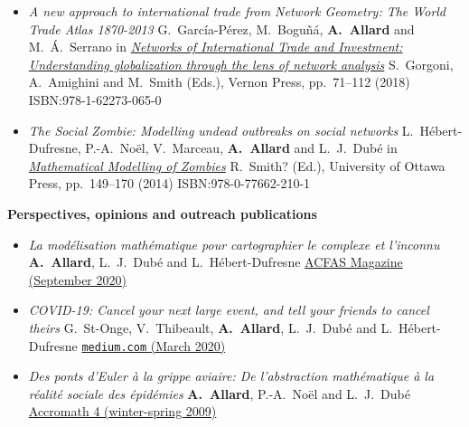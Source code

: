 \documentclass[11pt]{article}
\begin{document}
\begin{itemize}[itemsep=0.5em]
%
  \item \textit{A new approach to international trade from Network Geometry: The World Trade Atlas 1870-2013}\split
  G.~Garc\'ia-P\'erez, M.~Bogu\~n\'a, \textbf{A.~Allard} and M.~\'A.~Serrano\split
  in \href{https://vernonpress.com/book/96}{\textit{Networks of International Trade and Investment: Understanding globalization through the lens of network analysis}}\split
  S.~Gorgoni, A.~Amighini and M.~Smith (Eds.), Vernon Press, pp.~71--112 (2018) ISBN:978-1-62273-065-0
%
  \item \textit{The Social Zombie: Modelling undead outbreaks on social networks}\split
  L.~H\'ebert-Dufresne, P.-A.~No\"el, V.~Marceau, \textbf{A.~Allard} and L.~J.~Dub\'e\split
  in \href{http://www.press.uottawa.ca/mathematical-modelling-of-zombies}{\textit{Mathematical Modelling of Zombies}}\split
  R.~Smith$\!$? (Ed.), University of Ottawa Press, pp.~149--170 (2014) ISBN:978-0-77662-210-1
%
\end{itemize}
%
%
%
\textbf{Perspectives, opinions and outreach publications}
%
\begin{itemize}[itemsep=0.5em]
%
  \item \textit{La modélisation mathématique pour cartographier le complexe et l’inconnu}\footnotemark\split
  \textbf{A.~Allard}, L.~J.~Dub\'e and L.~H\'ebert-Dufresne\split
  \href{https://www.acfas.ca/publications/magazine/2019/09/modelisation-mathematique-cartographier-complexe-inconnu}{ACFAS Magazine (September 2020)}
%
%
  \item \textit{COVID-19: Cancel your next large event, and tell your friends to cancel theirs}\split
  G.~St-Onge, V.~Thibeault, \textbf{A.~Allard}, L.~J.~Dub\'e and L.~H\'ebert-Dufresne\split
  \href{https://medium.com/@antoine.allard/covid-19-cancel-your-next-large-event-and-tell-your-friends-to-cancel-theirs-7c06e688474e}{\texttt{medium.com} (March 2020)}
%
  \item \textit{Des ponts d'Euler \`a la grippe aviaire: De l'abstraction math\'ematique \`a la r\'ealit\'e sociale des \'epid\'emies}\footnotemark\split
  \textbf{A.~Allard}, P.-A.~No\"el and L.~J.~Dub\'e\split
  \href{https://accromath.uqam.ca/2009/02/des-ponts-deuler-a-la-grippe-aviaire/}{Accromath 4 (winter-spring 2009)}
%
%
\end{itemize}
\end{document}

